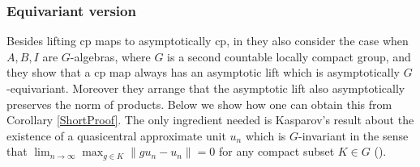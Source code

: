 \documentclass{article}%
\begin{document}
\subsubsection{Equivariant version}
Besides lifting  cp maps to asymptotically cp, in \cite{FGT} they also consider the case when  $A, B, I$ are $G$-algebras, where $G$ is a second countable locally compact group,  and they show that a cp map always has an asymptotic lift which is asymptotically $G$-equivariant. Moreover they arrange that the asymptotic lift also asymptotically preserves the norm of products. Below we show how one can obtain this from Corollary \ref{ShortProof}.
The only ingredient needed is Kasparov's result about the existence of a quasicentral approximate unit $u_{n}$
which is $G$-invariant in the sense that $\lim_{n\to \infty} \max_{g\in K}\|gu_n - u_n \|= 0$ for any compact subset  $K\in G$ (\cite{Kasparov2}).
\end{document}
